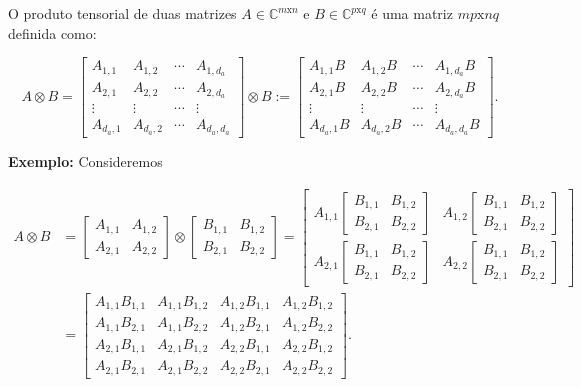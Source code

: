 \documentclass[11pt]{article}
\begin{document}
O produto tensorial de duas matrizes \(A\in\mathbb{C}^{m\mathrm{x}n}\) e
\(B\in\mathbb{C}^{p\mathrm{x}q}\) é uma matriz \(mp\mathrm{x}nq\)
definida como:

\begin{equation}
A\otimes B = \begin{bmatrix}A_{1,1} & A_{1,2} & \cdots & A_{1,d_{a}} \\ A_{2,1} & A_{2,2} & \cdots & A_{2,d_{a}} \\ \vdots & \vdots & \cdots & \vdots \\ A_{d_{a},1} & A_{d_{a},2} & \cdots & A_{d_{a},d_{a}} \end{bmatrix}\otimes B := \begin{bmatrix}A_{1,1}B & A_{1,2}B & \cdots & A_{1,d_{a}}B \\ A_{2,1}B & A_{2,2}B & \cdots & A_{2,d_{a}}B \\ \vdots & \vdots & \cdots & \vdots \\ A_{d_{a},1}B & A_{d_{a},2}B & \cdots & A_{d_{a},d_{a}}B \end{bmatrix}.
\end{equation}

\textbf{Exemplo:} Consideremos

\begin{align}
A\otimes B & = \begin{bmatrix} A_{1,1} & A_{1,2} \\ A_{2,1} & A_{2,2} \end{bmatrix} \otimes \begin{bmatrix} B_{1,1} & B_{1,2} \\ B_{2,1} & B_{2,2} \end{bmatrix} = \begin{bmatrix} A_{1,1}\begin{bmatrix} B_{1,1} & B_{1,2} \\ B_{2,1} & B_{2,2} \end{bmatrix} & A_{1,2}\begin{bmatrix} B_{1,1} & B_{1,2} \\ B_{2,1} & B_{2,2} \end{bmatrix} \\ A_{2,1}\begin{bmatrix} B_{1,1} & B_{1,2} \\ B_{2,1} & B_{2,2} \end{bmatrix} & A_{2,2}\begin{bmatrix} B_{1,1} & B_{1,2} \\ B_{2,1} & B_{2,2} \end{bmatrix} \end{bmatrix}  \\ 
& = \begin{bmatrix} A_{1,1}B_{1,1} & A_{1,1}B_{1,2} & A_{1,2}B_{1,1} & A_{1,2}B_{1,2} \\ A_{1,1}B_{2,1} & A_{1,1}B_{2,2} & A_{1,2}B_{2,1} & A_{1,2}B_{2,2}  \\ A_{2,1}B_{1,1} & A_{2,1}B_{1,2} & A_{2,2}B_{1,1} & A_{2,2}B_{1,2} \\ A_{2,1}B_{2,1} & A_{2,1}B_{2,2} & A_{2,2}B_{2,1} & A_{2,2}B_{2,2} \end{bmatrix}. 
\end{align}
\end{document}
